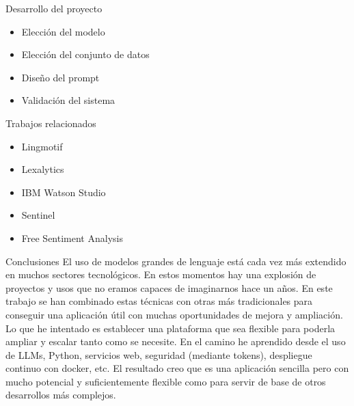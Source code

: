 \documentclass[aspectratio=169,xcolor=dvipsnames, t]{beamer}
\begin{document}
\begin{frame}{Desarrollo del proyecto}
    \begin{itemize}
        \item Elección del modelo
        \item Elección del conjunto de datos
        \item Diseño del prompt
        \item Validación del sistema
    \end{itemize}
\end{frame}


\begin{frame}{Trabajos relacionados}
    \begin{itemize}
        \item Lingmotif
        \item Lexalytics
        \item IBM Watson Studio
        \item Sentinel
        \item Free Sentiment Analysis   
    \end{itemize}
\end{frame}


\begin{frame}{Conclusiones}
    El uso de modelos grandes de lenguaje está cada vez más extendido en muchos sectores tecnológicos.
En estos momentos hay una explosión de proyectos y usos que no eramos capaces de imaginarnos hace un años.
En este trabajo se han combinado estas técnicas con otras más tradicionales para conseguir una aplicación 
útil con muchas oportunidades de mejora y ampliación.
Lo que he intentado es establecer una plataforma que sea flexible para poderla ampliar y escalar tanto como se necesite.
En el camino he aprendido desde el uso de LLMs, Python, servicios web, seguridad (mediante tokens), 
despliegue continuo con docker, etc. El resultado creo que es una aplicación sencilla pero 
con mucho potencial y suficientemente flexible como para servir de base de otros desarrollos más complejos.
\end{frame}
\end{document}
